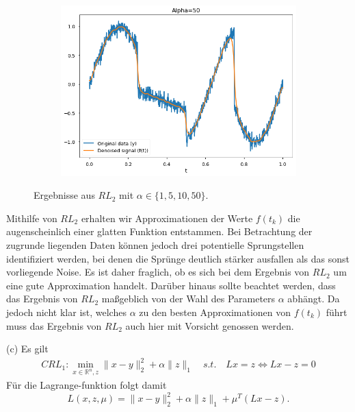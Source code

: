 \documentclass[ngerman, a4paper,12pt]{article}
\begin{document}
\begin{figure}[h]
\begin{subfigure}[b]{0.45\textwidth}
		\label{2a10}
	\end{subfigure}
	\begin{subfigure}[b]{0.45\textwidth}
		\includegraphics[width=1\columnwidth]{Images/2a50.png}
		\label{2a50}
	\end{subfigure}
	\caption{Ergebnisse aus $RL_2$ mit $\alpha \in \{1, 5, 10, 50\}$.}
	\vspace{-20pt}
\end{figure}
Mithilfe von $RL_2$ erhalten wir Approximationen der Werte $f(t_k)$ die augenscheinlich einer glatten Funktion entstammen. Bei Betrachtung der zugrunde liegenden Daten können jedoch drei potentielle Sprungstellen identifiziert werden, bei denen die Sprünge deutlich stärker ausfallen als das sonst vorliegende Noise. Es ist daher fraglich, ob es sich bei dem Ergebnis von $RL_2$ um eine gute Approximation handelt. Darüber hinaus sollte beachtet werden, dass das Ergebnis von $RL_2$ maßgeblich von der Wahl des Parameters $\alpha$ abhängt. Da jedoch nicht klar ist, welches $\alpha$ zu den besten Approximationen von $f(t_k)$ führt muss das Ergebnis von $RL_2$ auch hier mit Vorsicht genossen werden.
\par
(c) Es gilt
\begin{equation*}
	\begin{split}
	CRL_1: \min_{x\in\mathbb R^n,z}\|x-y\|_2^2+\alpha\|z\|_1 \quad s.t. \quad Lx = z \Leftrightarrow Lx - z=0
	\end{split}
\end{equation*}
Für die Lagrange-funktion folgt damit
\begin{equation}
\label{eq:lagrange}
L(x,z,\mu)=\|x-y\|_2^2+\alpha \|z\|_1+\mu^T(Lx - z).
\end{equation}
\end{document}
